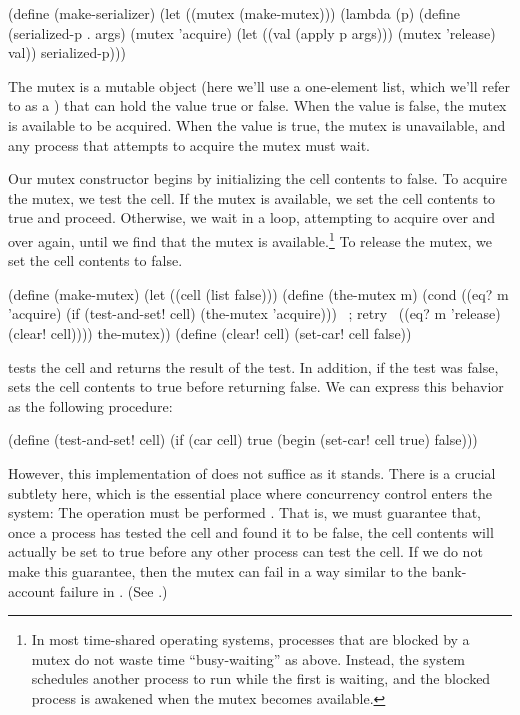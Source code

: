 \begin{codeBlock}
(define (make-serializer)
  (let ((mutex (make-mutex)))
    (lambda (p)
      (define (serialized-p . args)
        (mutex 'acquire)
        (let ((val (apply p args)))
          (mutex 'release)
          val))
      serialized-p)))
\end{codeBlock}

\noindent
The mutex is a mutable object (here we'll use a one-element list, which we'll
refer to as a ) that can hold the value true or false.  When the
value is false, the mutex is available to be acquired.  When the value is true,
the mutex is unavailable, and any process that attempts to acquire the mutex
must wait.

Our mutex constructor  begins by initializing the cell
contents to false.  To acquire the mutex, we test the cell.  If the mutex is
available, we set the cell contents to true and proceed.  Otherwise, we wait in
a loop, attempting to acquire over and over again, until we find that the mutex
is available.\footnote{In most time-shared operating systems, processes that
are blocked by a mutex do not waste time ``busy-waiting'' as above.  Instead,
the system schedules another process to run while the first is waiting, and the
blocked process is awakened when the mutex becomes available.}  To release the
mutex, we set the cell contents to false.

\begin{codeBlock}
(define (make-mutex)
  (let ((cell (list false)))
    (define (the-mutex m)
      (cond ((eq? m 'acquire)
             (if (test-and-set! cell)
                 (the-mutex 'acquire))) ~\textrm{; retry}~
            ((eq? m 'release) (clear! cell))))
    the-mutex))
(define (clear! cell) (set-car! cell false))
\end{codeBlock}

\noindent
{} tests the cell and returns the result of the test.  In
addition, if the test was false,  sets the cell contents to
true before returning false.  We can express this behavior as the following
procedure:

\begin{codeBlock}
(define (test-and-set! cell)
  (if (car cell) true (begin (set-car! cell true) false)))
\end{codeBlock}

\noindent
However, this implementation of  does not suffice as it
stands.  There is a crucial subtlety here, which is the essential place where
concurrency control enters the system: The  operation must
be performed .  That is, we must guarantee that, once a
process has tested the cell and found it to be false, the cell contents will
actually be set to true before any other process can test the cell.  If we do
not make this guarantee, then the mutex can fail in a way similar to the
bank-account failure in .  (See .)

